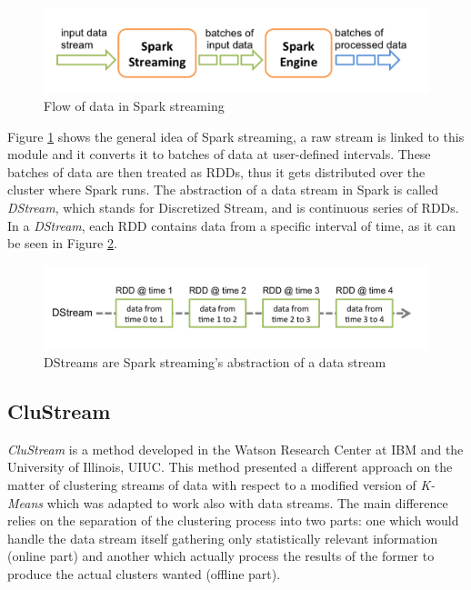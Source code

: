 \documentclass{llncs}
\begin{document}
\begin{figure}[h!]
 \centering
 \includegraphics[scale=0.6]{./styles/streaming-flow.png}
 \caption{Flow of data in Spark streaming}
 \label{fig:streamFlow}
\end{figure}

Figure \ref{fig:streamFlow} shows the general idea of Spark streaming\cite{sparkStreaming}, a raw stream is linked to this module and it converts it to batches of data at user-defined intervals. These batches of data are then treated as RDDs, thus it gets distributed over the cluster where Spark runs. The abstraction of a data stream in Spark is called \textit{DStream}, which stands for Discretized Stream, and is continuous series of RDDs. In a \textit{DStream}, each RDD contains data from a specific interval of time, as it can be seen in Figure \ref{fig:dstream}.


\begin{figure}[h!]
 \centering
 \includegraphics[scale=0.6]{./styles/streaming-dstream.png}
 \caption{DStreams are Spark streaming's abstraction of a data stream}
 \label{fig:dstream}
\end{figure}

\subsection{CluStream}

\textit{CluStream} is a method developed in the Watson Research Center at IBM and the University of Illinois, UIUC. This method presented a different approach on the matter of clustering streams of data with respect to a modified version of \textit{K-Means} which was adapted to work also with data streams. The main difference relies on the separation of the clustering process into two parts: one which would handle the data stream itself gathering only statistically relevant information (online part) and another which actually process the results of the former to produce the actual clusters wanted (offline part). 
\end{document}
